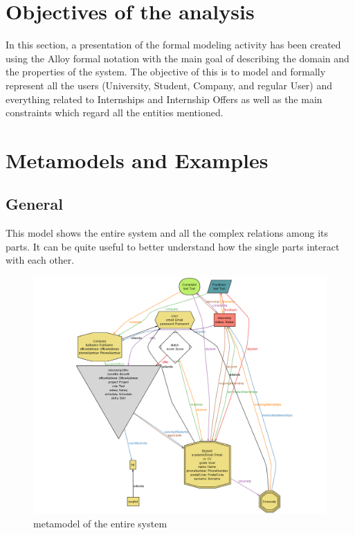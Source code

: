 \section{Objectives of the analysis}
In this section, a presentation of the formal modeling activity has been created using the Alloy formal notation with the main goal of describing the domain and the properties of the system. 
The objective of this is to model and formally represent all the users (University, Student, Company, and regular User) and everything related to Internships and Internship Offers as well as the main constraints which regard all the entities mentioned.
\vspace{0.5cm}

\newpage
\section{Metamodels and Examples}
\subsection{General}
This model shows the entire system and all the complex relations among its parts. It can be quite useful to better understand how the single parts interact with each other.
\begin{figure}[H]
    \centering
    \includegraphics[width=0.75\linewidth]{Images/Alloy/metamodel.png}
    \caption{metamodel of the entire system }
    \label{fig:enter-label}
\end{figure}
